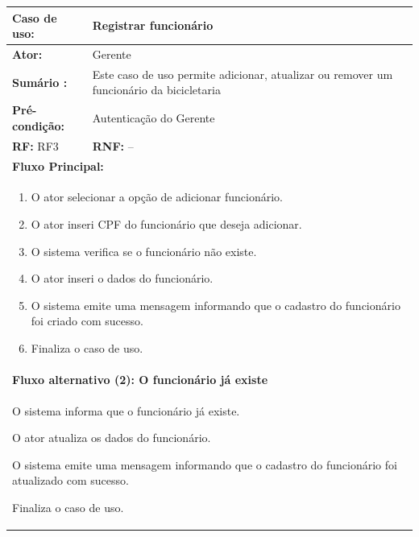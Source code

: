 \documentclass[
	12pt,				%
	openright,
	oneside,			%
	a4paper,			%
	chapter=TITLE,		%
	brazil				%
	]{abntex2}
\begin{document}
\begin{table}[h]
\centering
\begin{tabular}{|p{3cm}|p{3cm}|p{3cm}|p{3cm}|}
\hline
\textbf{Caso de uso:}             & \multicolumn{3}{p{9cm}|}{Registrar funcionário}				 \\ \hline
\textbf{Ator:}                 & \multicolumn{3}{p{9cm}|}{Gerente}         			          						 	\\ \hline
\textbf{Sumário :}                & \multicolumn{3}{p{9cm}|}{Este caso de uso permite adicionar, atualizar ou remover um funcionário %
													 da bicicletaria} 											        	\\ \hline
\textbf{Pré-condição:}            & \multicolumn{3}{p{9cm}|}{ Autenticação do Gerente }                				    \\ \hline
\multicolumn{2}{|p{6cm}|}{\textbf{RF:} RF3 }                  & \multicolumn{2}{p{6cm}|}{\textbf{RNF:} --}     	    \\ \hline
\multicolumn{4}{|p{12cm}|}{\textbf{Fluxo Principal:}}                                                					\\ \hline
\multicolumn{4}{|p{12cm}|}{%
\begin{enumerate}
  \item O ator selecionar a opção de adicionar funcionário.
  \item O ator inseri CPF do funcionário que deseja adicionar.
  \item O sistema verifica se o funcionário não existe.
  \item O ator inseri o dados do funcionário.
  \item O sistema emite uma mensagem informando que o cadastro do funcionário foi criado com sucesso.
  \item Finaliza o caso de uso.
\end{enumerate}}                                                               				 							\\ \hline

\multicolumn{4}{|p{12cm}|}{\textbf{Fluxo alternativo (2): O funcionário já existe}}            							\\ \hline
\multicolumn{4}{|p{12cm}|}{%
\begin{alineas}
  \item O sistema informa que o funcionário já existe.
  \item O ator atualiza os dados do funcionário.
  \item O sistema emite uma mensagem informando que o cadastro do funcionário foi atualizado com sucesso.
  \item Finaliza o caso de uso.
\end{alineas}}                                                               				 							\\ \hline


\end{tabular}
\end{table}
\end{document}
